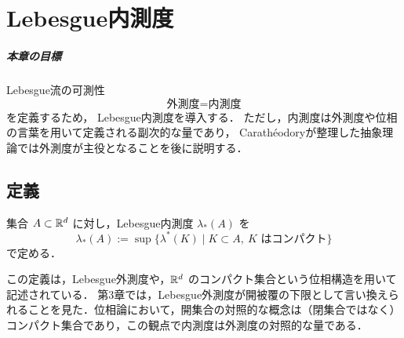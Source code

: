 \setcounter{chapter}{3}
\chapter{Lebesgue内測度}

\paragraph{本章の目標}
Lebesgue流の可測性
\[
\text{外測度}=\text{内測度}
\]
を定義するため，
Lebesgue内測度を導入する．
ただし，内測度は外測度や位相の言葉を用いて定義される副次的な量であり，
Carathéodoryが整理した抽象理論では外測度が主役となることを後に説明する．




\section{定義}

\begin{definition}[Lebesgue内測度]
集合 $A \subset \mathbb R^d$ に対し，Lebesgue内測度 $\lambda_*(A)$ を
\[
\lambda_*(A)
:=
\sup\{\lambda^*(K) \mid K \subset A,\ K \text{ はコンパクト}\}
\]
で定める．
\end{definition}

\begin{remark}
この定義は，Lebesgue外測度や，$\mathbb R^d$ のコンパクト集合という位相構造を用いて記述されている．
    第3章では，Lebesgue外測度が開被覆の下限として言い換えられることを見た．位相論において，開集合の対照的な概念は（閉集合ではなく）コンパクト集合であり，この観点で内測度は外測度の対照的な量である．
\end{remark}

